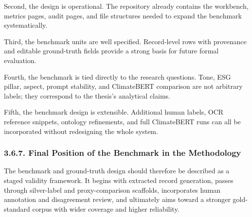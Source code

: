 \documentclass{article}
\begin{document}
Second, the design is operational. The repository already contains the workbench, metrics pages, audit pages, and file structures needed to expand the benchmark systematically.

Third, the benchmark units are well specified. Record-level rows with provenance and editable ground-truth fields provide a strong basis for future formal evaluation.

Fourth, the benchmark is tied directly to the research questions. Tone, ESG pillar, aspect, prompt stability, and ClimateBERT comparison are not arbitrary labels; they correspond to the thesis’s analytical claims.

Fifth, the benchmark design is extensible. Additional human labels, OCR reference snippets, ontology refinements, and full ClimateBERT runs can all be incorporated without redesigning the whole system.
\subsubsection*{ 3.6.7. Final Position of the Benchmark in the Methodology}

The benchmark and ground-truth design should therefore be described as a staged validity framework. It begins with extracted record generation, passes through silver-label and proxy-comparison scaffolds, incorporates human annotation and disagreement review, and ultimately aims toward a stronger gold-standard corpus with wider coverage and higher reliability.
\end{document}
